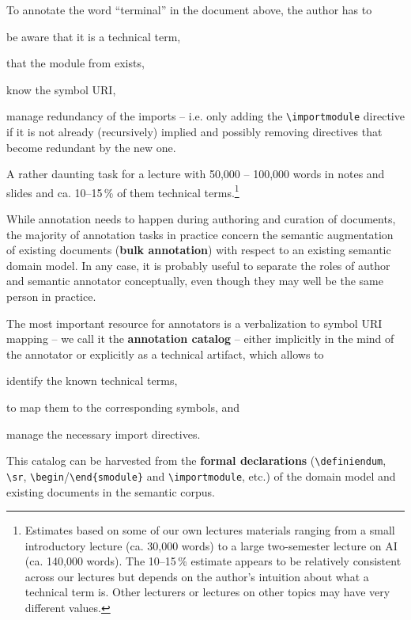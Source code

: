 \documentclass[runningheads]{llncs}
\begin{document}
To annotate the word ``terminal'' in the document above, the author has to 
\begin{inparaenum}[\em i\rm)]
\item be aware that it is a
technical term, 
\item that the module from  exists,
\item know the symbol URI, 
\item manage redundancy of the imports -- i.e. only adding the \lstinline|\importmodule|
  directive if it is not already (recursively) implied and possibly removing directives
  that become redundant by the new one.
\end{inparaenum}
A rather daunting task for a lecture with 50,000 -- 100,000 words in notes and slides and ca. 10--15\,\% of them technical terms.\footnote{
        Estimates based on some of our own lectures materials
        ranging from a small introductory lecture (ca. 30,000 words)
        to a large two-semester lecture on AI (ca. 140,000 words).
        The 10--15\,\% estimate appears to be relatively consistent across our lectures
        but depends on the author's intuition about what a technical term is.
        Other lecturers or lectures on other topics may have very different values.
}

While annotation needs to happen during authoring and curation of documents, the majority
of annotation tasks in practice concern the semantic augmentation of existing documents
(\textbf{bulk annotation}) with respect to an existing semantic domain model. In any case,
it is probably useful to separate the roles of author and semantic annotator conceptually,
even though they may well be the same person in practice.

The most important resource for annotators is a verbalization to symbol URI mapping -- we
call it the \textbf{annotation catalog} -- either implicitly in the mind of the annotator
or explicitly as a technical artifact, which allows to
\begin{inparaenum}[\em i\rm)]
\item identify the known technical terms,
\item to map them to the corresponding symbols, and 
\item manage the necessary import directives.
\end{inparaenum}
This catalog can be harvested from the \textbf{formal declarations}
(\lstinline|\definiendum|, \lstinline|\sr|, \lstinline[language={}]|\begin|/\lstinline[language={}]|\end{smodule}| and
\lstinline|\importmodule|, etc.) of the domain model and existing documents in the
semantic corpus.
\end{document}
